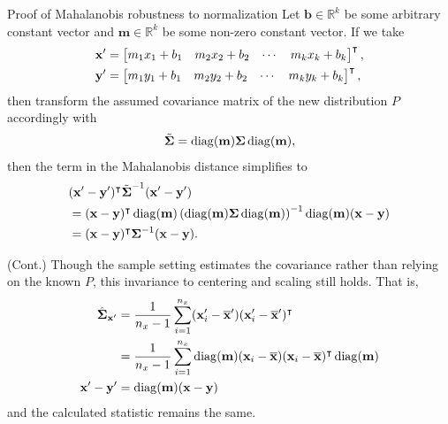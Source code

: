 \documentclass[aspectratio=169, handout]{beamer}
\begin{document}
\begin{frame}{Proof of Mahalanobis robustness to normalization}
Let \( \mathbf{b} \in \mathbb{R}^k \) be some arbitrary constant vector and \( \mathbf{m} \in \mathbb{R}^k\) be some non-zero constant vector. If we take 
\begin{align*}
\mathbf{x}' &= \begin{bmatrix} m_1 x_1 + b_1 & m_2 x_2 + b_2 & \cdots & m_k x_k + b_k  \end{bmatrix}^\intercal, \\
\mathbf{y}' &= \begin{bmatrix} m_1 y_1 + b_1 & m_2 y_2 + b_2 & \cdots & m_k y_k + b_k  \end{bmatrix}^\intercal,
\end{align*}
then transform the assumed covariance matrix of the new distribution \( P \) accordingly with \[
\tilde{\boldsymbol{\Sigma}} = \operatorname*{diag} (\mathbf{m}) \boldsymbol\Sigma \operatorname*{diag} (\mathbf{m}), \] then the term in the Mahalanobis distance simplifies to
\begin{align*}
& (\mathbf{x}' - \mathbf{y}')^\intercal \tilde{\boldsymbol\Sigma}^{-1} (\mathbf{x}' - \mathbf{y}') \\
&= 
(\mathbf{x} - \mathbf{y})^\intercal \operatorname*{diag} (\mathbf{m}) \left(  \operatorname*{diag} (\mathbf{m}) \boldsymbol\Sigma \operatorname*{diag} (\mathbf{m}) \right)^{-1} \operatorname*{diag} (\mathbf{m}) (\mathbf{x} - \mathbf{y}) \\
&= (\mathbf{x} - \mathbf{y})^\intercal \boldsymbol\Sigma^{-1} (\mathbf{x} - \mathbf{y}).
\end{align*}
\end{frame}

\begin{frame}{(Cont.)}
Though the sample setting estimates the covariance rather than relying on the known \( P \), this invariance to centering and scaling still holds. That is, 
\begin{align*}
\hat{\boldsymbol\Sigma}_{\mathbf{x}'} &= \frac{1}{n_x - 1} \sum_{i = 1}^{n_x} (\mathbf{x}_i' - \overline{\mathbf{x}}') (\mathbf{x}_i' - \overline{\mathbf{x}}')^\intercal \\
&= \frac{1}{n_x - 1} \sum_{i = 1}^{n_x} \operatorname*{diag}(\mathbf{m}) (\mathbf{x}_i - \overline{\mathbf{x}}) (\mathbf{x}_i - \overline{\mathbf{x}})^\intercal \operatorname*{diag} (\mathbf{m}) \\
\mathbf{x}' - \mathbf{y}' &= \operatorname*{diag} (\mathbf{m}) (\mathbf{x} - \mathbf{y})
\end{align*}
and the calculated statistic remains the same. 
\end{frame}
\end{document}
